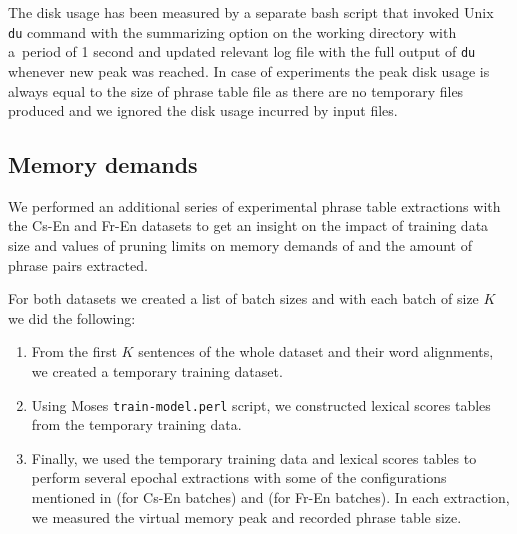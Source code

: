 The disk usage has been measured by a separate bash script that invoked Unix
\texttt{du} command with the summarizing option on the working directory with
a~period of 1 second and updated relevant log file with the full output of
\texttt{du} whenever new peak was reached.
In case of \eppex{} experiments the peak disk usage is always equal to the
size of phrase table file as there are no temporary files produced and we
ignored the disk usage incurred by input files.

\subsection{Memory demands}
\label{sec:memory-benchmarking}

We performed an additional series of experimental phrase table extractions with
the Cs-En and Fr-En datasets to get an insight on the impact of training data size and
values of pruning limits on memory demands of \eppex{} and the amount of phrase pairs
extracted.

For both datasets we created a list of batch sizes and with each batch of size $K$ we did the following:
\begin{enumerate}
  \item From the first $K$ sentences of the whole dataset and their word alignments, we
    created a temporary training dataset.
  \item Using Moses \texttt{train-model.perl} script, we constructed lexical scores tables
    from the temporary training data.
  \item Finally, we used the temporary training data and lexical scores tables to perform several epochal
    extractions with some of the configurations mentioned in
     (for Cs-En batches) and  (for Fr-En batches).
    In each extraction, we measured the virtual memory peak and recorded phrase table size.
\end{enumerate}
